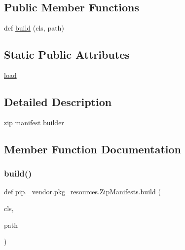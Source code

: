 \subsection*{Public Member Functions}
\begin{DoxyCompactItemize}
\item 
def \hyperlink{classpip_1_1__vendor_1_1pkg__resources_1_1ZipManifests_a1939b117874bfe71c3f7d92fdd61b9a0}{build} (cls, path)
\end{DoxyCompactItemize}
\subsection*{Static Public Attributes}
\begin{DoxyCompactItemize}
\item 
\hyperlink{classpip_1_1__vendor_1_1pkg__resources_1_1ZipManifests_acb75d7d7f6ac948265a06e161a414cee}{load}
\end{DoxyCompactItemize}


\subsection{Detailed Description}
\begin{DoxyVerb}zip manifest builder
\end{DoxyVerb}
 

\subsection{Member Function Documentation}
\mbox{\label{classpip_1_1__vendor_1_1pkg__resources_1_1ZipManifests_a1939b117874bfe71c3f7d92fdd61b9a0}} 
\subsubsection{\texorpdfstring{build()}{build()}}
{\footnotesize\ttfamily def pip.\+\_\+vendor.\+pkg\+\_\+resources.\+Zip\+Manifests.\+build (\begin{DoxyParamCaption}\item[{}]{cls,  }\item[{}]{path }\end{DoxyParamCaption})}

